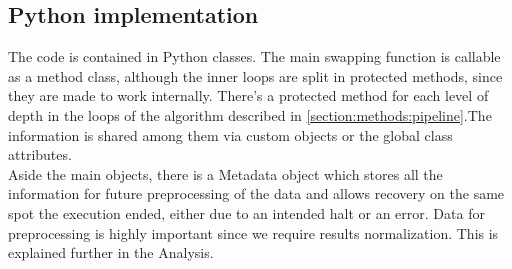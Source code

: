 \subsection{Python implementation}
The code is contained in Python classes. The main swapping function is callable as a method class, although the inner loops are split in protected methods, since they are made to work internally. There’s a protected method for each level of depth in the loops of the algorithm described in \ref{section:methods:pipeline}.The information is shared among them via custom objects or the global class attributes.
\\

Aside the main objects, there is a Metadata object which stores all the information for future preprocessing of the data and allows recovery on the same spot the execution ended, either due to an intended halt or an error.
Data for preprocessing is highly important since we require results normalization. This is explained further in the Analysis.